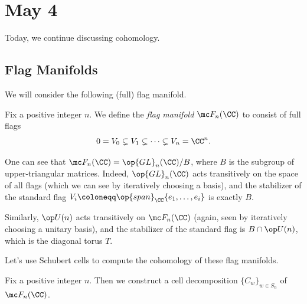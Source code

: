 \documentclass[../notes.tex]{subfiles}
\begin{document}
\section{May 4}
Today, we continue discussing cohomology.

\subsection{Flag Manifolds}
We will consider the following (full) flag manifold.
\begin{definition}
	Fix a positive integer $n$. We define the \textit{flag manifold} $\mc F_n(\CC)$ to consist of full flags
	\[0=V_0\subsetneq V_1\subsetneq\cdots\subsetneq V_n=\CC^n.\]
\end{definition}
\begin{remark}
	One can see that $\mc F_n(\CC)=\op{GL}_n(\CC)/B$, where $B$ is the subgroup of upper-triangular matrices. Indeed, $\op{GL}_n(\CC)$ acts transitively on the space of all flags (which we can see by iteratively choosing a basis), and the stabilizer of the standard flag $V_i\coloneqq\op{span}_\CC\{e_1,\ldots,e_i\}$ is exactly $B$.
\end{remark}
\begin{remark}
	Similarly, $\op U(n)$ acts transitively on $\mc F_n(\CC)$ (again, seen by iteratively choosing a unitary basis), and the stabilizer of the standard flag is $B\cap\op U(n)$, which is the diagonal torus $T$.
\end{remark}
Let's use Schubert cells to compute the cohomology of these flag manifolds.
\begin{lemma}
	Fix a positive integer $n$. Then we construct a cell decomposition $\{C_w\}_{w\in S_n}$ of $\mc F_n(\CC)$.
\end{lemma}
\end{document}
